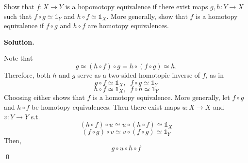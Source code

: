 \documentclass[12pt]{book}
\newcommand{\heq}{\simeq}
\newcommand{\id}{\mathds{1}}
\theoremstyle{definition}
\newenvironment{solution}
{%
  \par\noindent\textbf{Solution.}\quad
}
{%
  \qed\par
}
{
  \vspace{2pt}
}
\begin{document}
\begin{taggedexercise}[\textcolor{red}{TODO}]
  
\end{taggedexercise}

\begin{taggedexercise}[\textcolor{red}{TODO}]
  
\end{taggedexercise}

\begin{taggedexercise}[\textcolor{red}{TODO}]
  
\end{taggedexercise}

\begin{taggedexercise}[\textcolor{red}{TODO}]
  
\end{taggedexercise}

\begin{taggedexercise}[\textcolor{red}{TODO}]
  
\end{taggedexercise}

\begin{taggedexercise}[\textcolor{red}{TODO}]
  
\end{taggedexercise}

\begin{taggedexercise}[\textcolor{yellow}{WIP}]
  Show that $f: X \to Y$ is a hopomotopy equivalence if there exist maps $g,h: Y \to X$ such that $f \circ g \heq \id_Y$ 
  and $h \circ f \heq \id_X$.
  More generally, show that $f$ is a homotopy equivalence if $f \circ g$ and $h \circ f$ are homotopy equivalences.
\end{taggedexercise}

\begin{solution}
  Note that 
  \[g \heq (h \circ f) \circ g = h \circ (f \circ g) \heq h.\]
  Therefore, both $h$ and $g$ serve as a two-sided homotopic inverse of $f$, as in 
  \[g\circ f \heq \id_X, \;\; f\circ g \heq \id_Y\]
  \[h\circ f \heq \id_X, \;\; f\circ h \heq \id_Y\]
  Choosing either shows that $f$ is a homotopy equivalence.
  More generally, let $f \circ g$ and $h \circ f$ be homotopy equivalences.
  Then there exist maps $u: X \to X$ and $v: Y\to Y$ s.t. 
  \[(h \circ f) \circ u \heq u \circ (h \circ f) \heq \id_X\]
  \[(f \circ g) \circ v \heq v \circ (f \circ g) \heq \id_Y\]
  Then,
  \[g \circ u \circ h \circ f\]
\end{solution}
\end{document}
